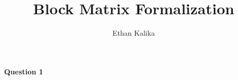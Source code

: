 \documentclass{article}
\title{Block Matrix Formalization}
\author{Ethan Kalika}
\begin{document}
\maketitle
\paragraph{Question 1}
\end{document}
